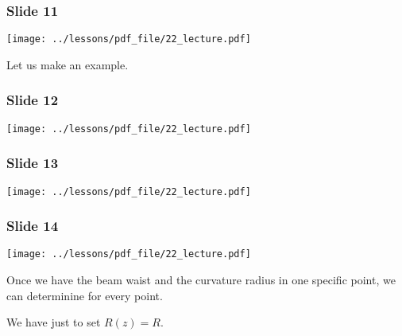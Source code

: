 \documentclass[../main/main.tex]{subfiles}
\begin{document}
\subsubsection*{Slide 11}

\begin{minipage}[]{0.5\linewidth}
\centering
\texttt{[image: ../lessons/pdf\_file/22\_lecture.pdf]}
\end{minipage}
\hspace{0.3cm}\vspace{0.3cm}
\begin{minipage}[c]{0.47\linewidth}

Let us make an example.

\end{minipage}

\subsubsection*{Slide 12}

\begin{minipage}[]{0.5\linewidth}
\centering
\texttt{[image: ../lessons/pdf\_file/22\_lecture.pdf]}
\end{minipage}
\hspace{0.3cm}\vspace{0.3cm}
\begin{minipage}[c]{0.47\linewidth}

\end{minipage}

\subsubsection*{Slide 13}

\begin{minipage}[]{0.5\linewidth}
\centering
\texttt{[image: ../lessons/pdf\_file/22\_lecture.pdf]}
\end{minipage}
\hspace{0.3cm}\vspace{0.3cm}
\begin{minipage}[c]{0.47\linewidth}

\end{minipage}

\subsubsection*{Slide 14}

\begin{minipage}[]{0.5\linewidth}
\centering
\texttt{[image: ../lessons/pdf\_file/22\_lecture.pdf]}
\end{minipage}
\hspace{0.3cm}\vspace{0.3cm}
\begin{minipage}[c]{0.47\linewidth}

Once we have the beam waist and the curvature radius in one specific point, we can determinine for every point.

We have just to set \( R(z) = R \).

\end{minipage}
\end{document}
